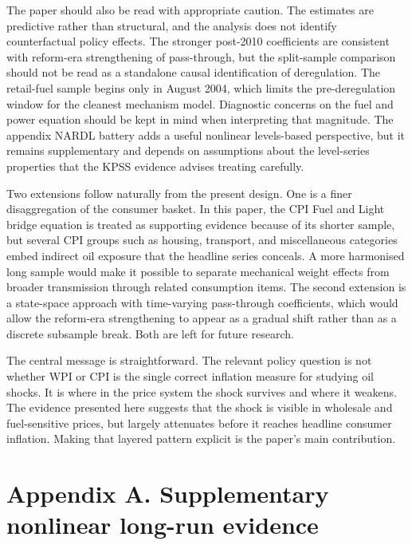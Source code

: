 \documentclass[11pt,a4paper]{article}
\begin{document}
The paper should also be read with appropriate caution. The estimates are predictive rather than structural, and the analysis does not identify counterfactual policy effects. The stronger post-2010 coefficients are consistent with reform-era strengthening of pass-through, but the split-sample comparison should not be read as a standalone causal identification of deregulation. The retail-fuel sample begins only in August 2004, which limits the pre-deregulation window for the cleanest mechanism model. Diagnostic concerns on the fuel and power equation should be kept in mind when interpreting that magnitude. The appendix NARDL battery adds a useful nonlinear levels-based perspective, but it remains supplementary and depends on assumptions about the level-series properties that the KPSS evidence advises treating carefully.

Two extensions follow naturally from the present design. One is a finer disaggregation of the consumer basket. In this paper, the CPI Fuel and Light bridge equation is treated as supporting evidence because of its shorter sample, but several CPI groups such as housing, transport, and miscellaneous categories embed indirect oil exposure that the headline series conceals. A more harmonised long sample would make it possible to separate mechanical weight effects from broader transmission through related consumption items. The second extension is a state-space approach with time-varying pass-through coefficients, which would allow the reform-era strengthening to appear as a gradual shift rather than as a discrete subsample break. Both are left for future research.

The central message is straightforward. The relevant policy question is not whether WPI or CPI is the single correct inflation measure for studying oil shocks. It is where in the price system the shock survives and where it weakens. The evidence presented here suggests that the shock is visible in wholesale and fuel-sensitive prices, but largely attenuates before it reaches headline consumer inflation. Making that layered pattern explicit is the paper's main contribution.



\appendix

\section*{Appendix A. Supplementary nonlinear long-run evidence}
\end{document}
